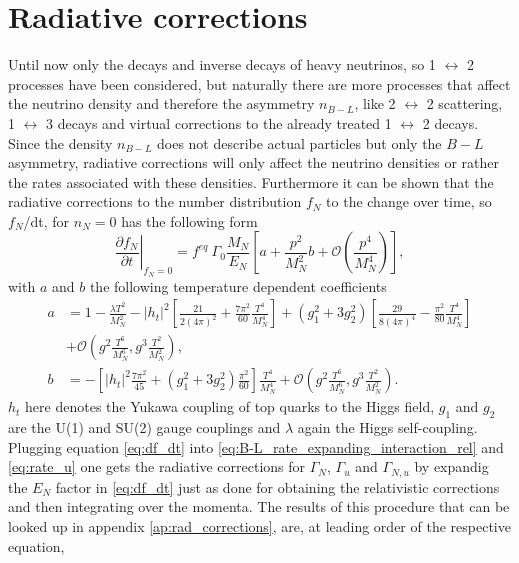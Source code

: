 \section{Radiative corrections}
Until now only the decays and inverse decays of heavy neutrinos, so 1 $\leftrightarrow$ 2 processes have been considered, but naturally there are more processes that affect the neutrino density and therefore the asymmetry $n_{B-L}$, like 2 $\leftrightarrow$ 2 scattering, 1 $\leftrightarrow$ 3 decays and virtual corrections to the already treated 1 $\leftrightarrow$ 2 decays. \newline\indent
Since the density $n_{B-L}$ does not describe actual particles but only the $B-L$ asymmetry, radiative corrections will only affect the neutrino densities or rather the rates associated with these densities. Furthermore it can be shown that the radiative corrections to the number distribution $f_N$ to the change over time, so $f_N$/dt, for $n_N=0$ has the following form \cite{Laine:2011pq}
\begin{equation}
\left.\frac{\partial f_N}{\partial t}\right|_{f_N=0}=f^{eq}\:\Gamma_0\frac{M_N}{E_N}\left[a+\frac{p^2}{M_N^2}b+\mathcal{O}\left(\frac{p^4}{M_N^4}\right)\right],
\label{eq:df_dt}
\end{equation}
with $a$ and $b$ the following temperature dependent coefficients
\begin{align}
a&=1-\frac{\lambda T^2}{M_N^2}-\left|h_t\right|^2\left[\frac{21}{2(4\pi)^2}+\frac{7\pi^2}{60}\frac{T^4}{M_N^4}\right]+\left(g_1^2+3g_2^2\right)\left[\frac{29}{8\left(4\pi\right)^4}-\frac{\pi^2}{80}\frac{T^4}{M_N^4}\right]\\
\nonumber
&+\mathcal{O}\left(g^2\frac{T^6}{M_N^6},g^3\frac{T^2}{M_N^2}\right),\\
b&=-\left[\left|h_t\right|^2\frac{7\pi^2}{45}+\left(g_1^2+3g_2^2\right)\frac{\pi^2}{60}\right]\frac{T^4}{M_N^4}+\mathcal{O}\left(g^2\frac{T^6}{M_N^6},g^3\frac{T^2}{M_N^2}\right).
\end{align}
$h_t$ here denotes the Yukawa coupling of top quarks to the Higgs field, $g_1$ and $g_2$ are the U(1) and SU(2) gauge couplings and $\lambda$ again the Higgs self-coupling. \newline\indent
Plugging equation \eqref{eq:df_dt} into \eqref{eq:B-L_rate_expanding_interaction_rel} and \eqref{eq:rate_u} one gets the radiative corrections for $\Gamma_N$, $\Gamma_u$ and $\Gamma_{N,u}$ by expandig the $E_N$ factor in \eqref{eq:df_dt} just as done for obtaining the relativistic corrections and then integrating over the momenta. The results of this procedure that can be looked up in appendix \ref{ap:rad_corrections}, are, at leading order of the respective equation,
